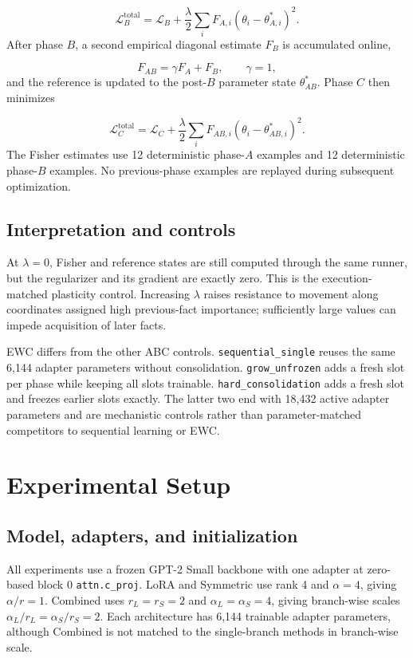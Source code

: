 \documentclass[12pt,a4paper]{article}
\begin{document}
\[
\mathcal L_B^{\mathrm{total}}
=
\mathcal L_B
+
\frac{\lambda}{2}
\sum_i F_{A,i}(\theta_i-\theta_{A,i}^\ast)^2.
\]
After phase \(B\), a second empirical diagonal estimate \(F_B\) is accumulated online,

\[
F_{AB}=\gamma F_A+F_B,
\qquad \gamma=1,
\]
and the reference is updated to the post-\(B\) parameter state \(\theta_{AB}^\ast\). Phase \(C\) then minimizes

\[
\mathcal L_C^{\mathrm{total}}
=
\mathcal L_C
+
\frac{\lambda}{2}
\sum_i F_{AB,i}(\theta_i-\theta_{AB,i}^\ast)^2.
\]
The Fisher estimates use 12 deterministic phase-\(A\) examples and 12 deterministic phase-\(B\) examples. No previous-phase examples are replayed during subsequent optimization.

\subsection{Interpretation and controls}
At \(\lambda=0\), Fisher and reference states are still computed through the same runner, but the regularizer and its gradient are exactly zero. This is the execution-matched plasticity control. Increasing \(\lambda\) raises resistance to movement along coordinates assigned high previous-fact importance; sufficiently large values can impede acquisition of later facts.

EWC differs from the other ABC controls. \texttt{sequential\_single} reuses the same 6,144 adapter parameters without consolidation. \texttt{grow\_unfrozen} adds a fresh slot per phase while keeping all slots trainable. \texttt{hard\_consolidation} adds a fresh slot and freezes earlier slots exactly. The latter two end with 18,432 active adapter parameters and are mechanistic controls rather than parameter-matched competitors to sequential learning or EWC.

\section{Experimental Setup}
\subsection{Model, adapters, and initialization}
All experiments use a frozen GPT-2 Small backbone \cite{ref3} with one adapter at zero-based block 0 \texttt{attn.c\_proj}. LoRA and Symmetric use rank 4 and \(\alpha=4\), giving \(\alpha/r=1\). Combined uses \(r_L=r_S=2\) and \(\alpha_L=\alpha_S=4\), giving branch-wise scales \(\alpha_L/r_L=\alpha_S/r_S=2\). Each architecture has 6,144 trainable adapter parameters, although Combined is not matched to the single-branch methods in branch-wise scale.
\end{document}
